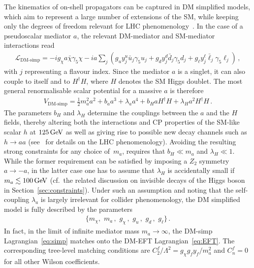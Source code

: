 \documentclass[a4paper, 11pt,notoc]{article}
\begin{document}
The kinematics of on-shell propagators can be captured in DM simplified models, which aim to represent a large number of extensions of the SM, while keeping only the degrees of freedom relevant for LHC phenomenology~\cite{Abdallah:2015ter,Abercrombie:2015wmb}. In the case of a pseudoscalar mediator $a$, the relevant DM-mediator and SM-mediator interactions read
\begin{align}\label{eq:simp}
\mathcal{L}_\text{DM-simp}=-i g_\chi a\bar \chi \gamma_5 \chi -i a \sum_j \left(g_u y_j^u \bar u_j \gamma_5 u_j + g_d y_j^d \bar d_j \gamma_5 d_j + g_\ell y_j^\ell \bar \ell_j\gamma_5 \ell_j  \right) \,,
\end{align}
with  $j$ representing a flavour index.  Since the mediator $a$ is a singlet, it can also couple to itself and to $H^\dagger H$, where $H$ denotes  the SM Higgs doublet. The most general renormalisable scalar potential for a massive $a$ is therefore
\begin{align}\label{eq:VaH}
V_\text{DM-simp} =\frac{1}{2}m_a^2 a^2 +  b_a a^3 + \lambda_a a^4 + b_{H} a H^\dagger H +\lambda_{H} a^2H^\dagger H \,.
\end{align}
The parameters $ b_{H}$  and $\lambda_{H}$ determine the couplings between the $a$ and the $H$ fields, thereby altering both the interactions and CP properties of the SM-like scalar $h$ at $125 \, {\rm GeV}$ as well as giving rise to possible new decay channels such as $h \to aa$ (see~\cite{Curtin:2013fra,Haisch:2018kqx} for details on the LHC phenomenology). Avoiding the resulting strong constraints for any choice of~$m_a$, requires that  $b_H \ll m_a $ and $\lambda_H \ll 1$. While the former requirement can be satisfied by imposing a $Z_2$ symmetry $a \to -a$, in the latter case one has to assume that $\lambda_H$ is accidentally small if $m_a \lesssim 100 \, {\rm GeV}$ (cf.~the related discussion on invisible decays of the Higgs boson in Section~\ref{sec:constraints}). Under such an assumption and noting that the self-coupling $\lambda_a$ is largely irrelevant for collider phenomenology, the DM simplified model is  fully described by the parameters 
\begin{align}
\big\{ m_\chi, \,\, m_a\,,\,\, g_\chi\,, \,\, g_u\,,\,\,g_d\,,\,\, g_\ell \big\}\,. 
\end{align}
In fact, in the  limit of infinite mediator mass $m_a \to \infty$,  the DM-simp Lagrangian~\eqref{eq:simp} matches onto the DM-EFT Lagrangian~\eqref{eq:EFT}. The corresponding tree-level matching conditions are $C^f_2/\Lambda^2 = g_\chi g_f y_f  /m_a^2$ and $C_n^f=0$ for all other Wilson coefficients.
\end{document}
